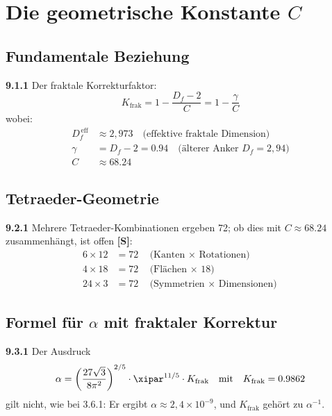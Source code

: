 \section{Die geometrische Konstante $C$}

\subsection{Fundamentale Beziehung}

\noindent \textbf{9.1.1} Der fraktale Korrekturfaktor:
\begin{equation}
	\boxed{K_{\text{frak}} = 1 - \frac{D_f - 2}{C} = 1 - \frac{\gamma}{C}}
\end{equation}
wobei:
\begin{align}
	D_f^{\,\text{eff}} &\approx 2{,}973 \quad \text{(effektive fraktale Dimension)} \\
	\gamma &= D_f - 2 = 0.94 \quad \text{(älterer Anker } D_f = 2{,}94\text{)} \\
	C &\approx 68.24
\end{align}

\subsection{Tetraeder-Geometrie}

\begin{tcolorbox}[colback=yellow!5!white,colframe=red!75!black,title=Tetraeder-Zahlen]
	\noindent \textbf{9.2.1} Mehrere Tetraeder-Kombinationen ergeben 72; ob dies mit $C \approx 68.24$ zusammenhängt, ist offen \textbf{[S]}:
	\begin{align}
		6 \times 12 &= 72 \quad \text{(Kanten $\times$ Rotationen)} \\
		4 \times 18 &= 72 \quad \text{(Flächen $\times$ 18)} \\
		24 \times 3 &= 72 \quad \text{(Symmetrien $\times$ Dimensionen)}
	\end{align}
\end{tcolorbox}

\subsection{Formel für $\alpha$ mit fraktaler Korrektur}

\noindent \textbf{9.3.1} Der Ausdruck
\begin{equation}
	\alpha = \left( \frac{27 \sqrt{3}}{8 \pi^2} \right)^{2/5} \cdot \xipar^{11/5} \cdot K_{\text{frak}}
	\quad \text{mit} \quad K_{\text{frak}} = 0.9862
\end{equation}
gilt nicht, wie bei 3.6.1: Er ergibt $\alpha \approx 2{,}4\times10^{-9}$, und $K_{\text{frak}}$ gehört zu $\alpha^{-1}$.

